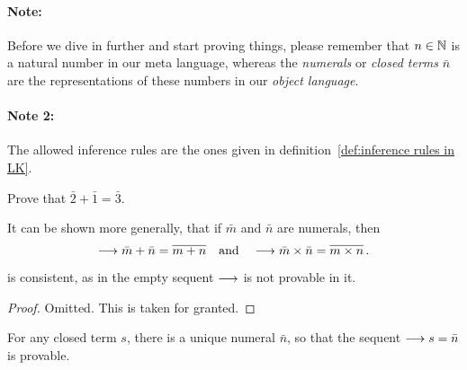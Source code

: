 \documentclass[11pt,a4paper]{article}
\begin{document}
\paragraph{Note:}
Before we dive in further and start proving things,
please remember that \(n\in\mathbb{N}\) is a natural number
in our meta language, whereas the \emph{numerals} or
\emph{closed terms} \(\bar n\) are the representations of
these numbers in our \emph{object language}.

\paragraph{Note 2:}
The allowed inference rules are the ones given in
definition~\ref{def:inference rules in LK}.

\begin{exercise}[PA.1]\label{exe_PA.1}
    Prove that \(\bar2 + \bar1 = \bar3\).
\end{exercise}

It can be shown more generally, that if \(\bar m\) and \(\bar n\)
are numerals, then
\begin{equation*}
    \longrightarrow\bar m + \bar n = \overline{m + n}
    \quad\text{and}\quad
    \longrightarrow\bar m \times \bar n = \overline{m \times n}\,.
\end{equation*}

\begin{proposition}[9.4]\label{prop:9.4}
    \PA{} is consistent, as in the empty sequent \(\longrightarrow\)
    is not provable in it.
\end{proposition}

\begin{proof}
    Omitted. This is taken for granted.
\end{proof}

\begin{proposition}[9.6.1]\label{prop:9.6.1}
    For any closed term \(s\), there is a unique numeral \(\bar n\),
    so that the sequent \(\longrightarrow s = \bar n\) is provable.
\end{proposition}
\end{document}
